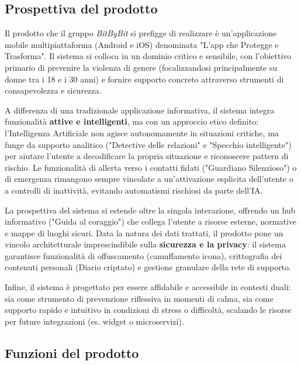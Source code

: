 \documentclass[a4paper,12pt]{article}
\begin{document}

\subsection{Prospettiva del prodotto} \label{sec:prospettiva_prodotto}
Il prodotto che il gruppo \textit{BitByBit} si prefigge di realizzare è un'applicazione mobile multipiattaforma (Android e iOS) denominata "L'app che Protegge e Trasforma". Il sistema si colloca in un dominio critico e sensibile, con l'obiettivo primario di prevenire la violenza di genere (focalizzandosi principalmente su donne tra i 18 e i 30 anni) e fornire supporto concreto attraverso strumenti di consapevolezza e sicurezza.

A differenza di una tradizionale applicazione informativa, il sistema integra funzionalità \textbf{attive e intelligenti}, ma con un approccio etico definito: l'Intelligenza Artificiale non agisce autonomamente in situazioni critiche, ma funge da supporto analitico ("Detective delle relazioni" e "Specchio intelligente") per aiutare l'utente a decodificare la propria situazione e riconoscere pattern di rischio. Le funzionalità di allerta verso i contatti fidati ("Guardiano Silenzioso") o di emergenza rimangono sempre vincolate a un'attivazione esplicita dell'utente o a controlli di inattività, evitando automatismi rischiosi da parte dell'IA.

La prospettiva del sistema si estende oltre la singola interazione, offrendo un hub informativo ("Guida al coraggio") che collega l'utente a risorse esterne, normative e mappe di luoghi sicuri. Data la natura dei dati trattati, il prodotto pone un vincolo architetturale imprescindibile sulla \textbf{sicurezza e la privacy}: il sistema garantisce funzionalità di offuscamento (camuffamento icona), crittografia dei contenuti personali (Diario criptato) e gestione granulare della rete di supporto.

Infine, il sistema è progettato per essere affidabile e accessibile in contesti duali: sia come strumento di prevenzione riflessiva in momenti di calma, sia come supporto rapido e intuitivo in condizioni di stress o difficoltà, scalando le risorse per future integrazioni (es. widget o microservizi).


\subsection{Funzioni del prodotto} \label{sec:funzioni_prodotto}
\end{document}
